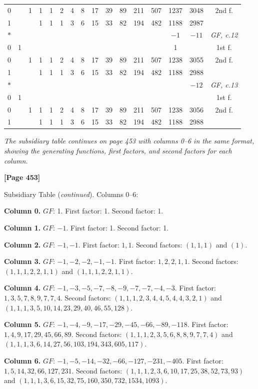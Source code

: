 \documentclass[11pt,a4paper]{article}
\begin{document}
\begin{small}
\begin{longtable}{|c|cccccccccccccc|c|}
\hline
0 & & 1 & 1 & 1 & 2 & 4 & 8 & 17 & 39 & 89 & 211 & 507 & 1237 & 3048 & 2nd f. \\
1 & & & 1 & 1 & 1 & 3 & 6 & 15 & 33 & 82 & 194 & 482 & 1188 & 2987 \\
\hline
$*$ & & & & & & & & & & & & & $-1$ & $-11$ & \textit{GF, c.12} \\
\hline
0 & 1 & & & & & & & & & & & & 1 & & 1st f. \\
\hline
0 & & 1 & 1 & 1 & 2 & 4 & 8 & 17 & 39 & 89 & 211 & 507 & 1238 & 3055 & 2nd f. \\
1 & & & 1 & 1 & 1 & 3 & 6 & 15 & 33 & 82 & 194 & 482 & 1188 & 2988 \\
\hline
$*$ & & & & & & & & & & & & & & $-12$ & \textit{GF, c.13} \\
\hline
0 & 1 & & & & & & & & & & & & & & 1st f. \\
\hline
0 & & 1 & 1 & 1 & 2 & 4 & 8 & 17 & 39 & 89 & 211 & 507 & 1238 & 3056 & 2nd f. \\
1 & & & 1 & 1 & 1 & 3 & 6 & 15 & 33 & 82 & 194 & 482 & 1188 & 2988 \\
\hline
\end{longtable}
\end{small}

\textit{The subsidiary table continues on page 453 with columns 0--6 in the same format, showing the generating functions, first factors, and second factors for each column.}

\newpage
\textbf{[Page 453]}

Subsidiary Table (\textit{continued}). Columns 0--6:

\begin{small}
\noindent\textbf{Column 0.} $GF$: 1. First factor: 1. Second factor: 1.

\noindent\textbf{Column 1.} $GF$: $-1$. First factor: 1. Second factor: 1.

\noindent\textbf{Column 2.} $GF$: $-1,-1$. First factor: $1,1$. Second factors: $(1,1,1)$ and $(1)$.

\noindent\textbf{Column 3.} $GF$: $-1,-2,-2,-1,-1$. First factor: $1,2,2,1,1$.
Second factors: $(1,1,1,2,2,1,1)$ and $(1,1,1,2,2,1,1)$.

\noindent\textbf{Column 4.} $GF$: $-1,-3,-5,-7,-8,-9,-7,-7,-4,-3$.
First factor: $1,3,5,7,8,9,7,7,4$.
Second factors: $(1,1,1,2,3,4,4,5,4,4,3,2,1)$ and $(1,1,1,3,5,10,14,23,29,40,46,55,128)$.

\noindent\textbf{Column 5.} $GF$: $-1,-4,-9,-17,-29,-45,-66,-89,-118$.
First factor: $1,4,9,17,29,45,66,89$.
Second factors: $(1,1,1,2,3,5,6,8,8,9,7,7,4)$ and $(1,1,1,3,6,14,27,56,103,194,343,605,117)$.

\noindent\textbf{Column 6.} $GF$: $-1,-5,-14,-32,-66,-127,-231,-405$.
First factor: $1,5,14,32,66,127,231$.
Second factors: $(1,1,1,2,3,6,10,17,25,38,52,73,93)$ and $(1,1,1,3,6,15,32,75,160,350,732,1534,1093)$.
\end{small}
\end{document}

